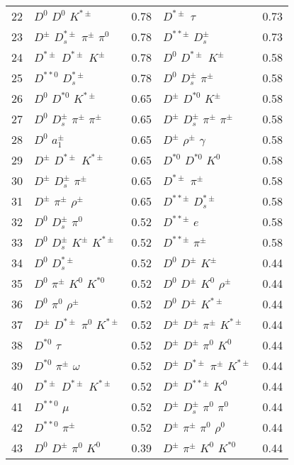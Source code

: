 \documentclass[6pt]{article}
\begin{document}
\begin{tabular}{rlr|lr}
22 & $D^0$ $D^0$ $K^{*\pm}$ & 0.78 & $D^{*\pm}$ $\tau$ & 0.73 \\
23 & $D^{\pm}$ $D_s^{*\pm}$ $\pi^{\pm}$ $\pi^0$ & 0.78 & $D^{**\pm}$ $D_s^{\pm}$ & 0.73 \\
24 & $D^{*\pm}$ $D^{*\pm}$ $K^{\pm}$ & 0.78 & $D^0$ $D^{*\pm}$ $K^{\pm}$ & 0.58 \\
25 & $D^{**0}$ $D_s^{*\pm}$ & 0.78 & $D^0$ $D_s^{\pm}$ $\pi^{\pm}$ & 0.58 \\
26 & $D^0$ $D^{*0}$ $K^{*\pm}$ & 0.65 & $D^{\pm}$ $D^{*0}$ $K^{\pm}$ & 0.58 \\
27 & $D^0$ $D_s^{\pm}$ $\pi^{\pm}$ $\pi^{\pm}$ & 0.65 & $D^{\pm}$ $D_s^{\pm}$ $\pi^{\pm}$ $\pi^{\pm}$ & 0.58 \\
28 & $D^0$ $a_1^{\pm}$ & 0.65 & $D^{\pm}$ $\rho^{\pm}$ $\gamma$ & 0.58 \\
29 & $D^{\pm}$ $D^{*\pm}$ $K^{*\pm}$ & 0.65 & $D^{*0}$ $D^{*0}$ $K^0$ & 0.58 \\
30 & $D^{\pm}$ $D_s^{\pm}$ $\pi^{\pm}$ & 0.65 & $D^{*\pm}$ $\pi^{\pm}$ & 0.58 \\
31 & $D^{\pm}$ $\pi^{\pm}$ $\rho^{\pm}$ & 0.65 & $D^{**\pm}$ $D_s^{*\pm}$ & 0.58 \\
32 & $D^0$ $D_s^{\pm}$ $\pi^0$ & 0.52 & $D^{**\pm}$ $e$ & 0.58 \\
33 & $D^0$ $D_s^{\pm}$ $K^{\pm}$ $K^{*\pm}$ & 0.52 & $D^{**\pm}$ $\pi^{\pm}$ & 0.58 \\
34 & $D^0$ $D_s^{*\pm}$ & 0.52 & $D^0$ $D^{\pm}$ $K^{\pm}$ & 0.44 \\
35 & $D^0$ $\pi^{\pm}$ $K^0$ $K^{*0}$ & 0.52 & $D^0$ $D^{\pm}$ $K^0$ $\rho^{\pm}$ & 0.44 \\
36 & $D^0$ $\pi^0$ $\rho^{\pm}$ & 0.52 & $D^0$ $D^{\pm}$ $K^{*\pm}$ & 0.44 \\
37 & $D^{\pm}$ $D^{*\pm}$ $\pi^0$ $K^{*\pm}$ & 0.52 & $D^{\pm}$ $D^{\pm}$ $\pi^{\pm}$ $K^{*\pm}$ & 0.44 \\
38 & $D^{*0}$ $\tau$ & 0.52 & $D^{\pm}$ $D^{\pm}$ $\pi^0$ $K^0$ & 0.44 \\
39 & $D^{*0}$ $\pi^{\pm}$ $\omega$ & 0.52 & $D^{\pm}$ $D^{*\pm}$ $\pi^{\pm}$ $K^{*\pm}$ & 0.44 \\
40 & $D^{*\pm}$ $D^{*\pm}$ $K^{*\pm}$ & 0.52 & $D^{\pm}$ $D^{**\pm}$ $K^0$ & 0.44 \\
41 & $D^{**0}$ $\mu$ & 0.52 & $D^{\pm}$ $D_s^{\pm}$ $\pi^0$ $\pi^0$ & 0.44 \\
42 & $D^{**0}$ $\pi^{\pm}$ & 0.52 & $D^{\pm}$ $\pi^{\pm}$ $\pi^0$ $\rho^0$ & 0.44 \\
43 & $D^0$ $D^{\pm}$ $\pi^0$ $K^0$ & 0.39 & $D^{\pm}$ $\pi^{\pm}$ $K^0$ $K^{*0}$ & 0.44 \\

\end{tabular}
\end{document}

